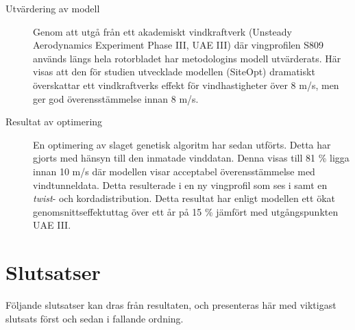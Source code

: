\begin{description}

\item[Utvärdering av modell] Genom att utgå från ett akademiskt vindkraftverk (Unsteady Aerodynamics Experiment Phase III, UAE III) där vingprofilen S809 används längs hela rotorbladet har metodologins modell utvärderats. Här visas att den för studien utvecklade modellen (SiteOpt) dramatiskt överskattar ett vindkraftverks effekt för vindhastigheter över 8 m/s, men ger god överensstämmelse innan 8 m/s.

\item[Resultat av optimering] En optimering av slaget genetisk algoritm har sedan utförts. Detta har gjorts med hänsyn till den inmatade vinddatan. Denna visas till 81 \% ligga innan 10 m/s där modellen visar acceptabel överensstämmelse med vindtunneldata. Detta resulterade i en ny vingprofil  som ses i  samt en \emph{twist}- och kordadistribution. Detta resultat har enligt modellen ett ökat genomsnittseffektuttag över ett år på 15 \% jämfört med utgångspunkten UAE III.

\end{description}



\section{Slutsatser}
\label{slutsatser}

Följande slutsatser kan dras från resultaten, och presenteras här med viktigast slutsats först och sedan i fallande ordning.

